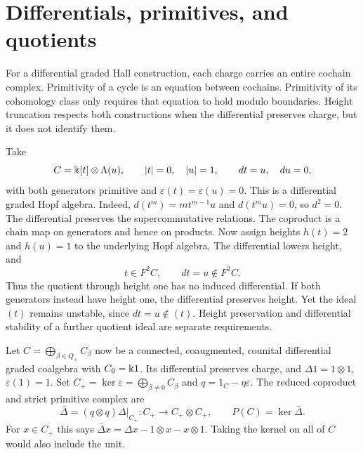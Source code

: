 \section{Differentials, primitives, and quotients}

For a differential graded Hall construction, each charge carries an
entire cochain complex.  Primitivity of a cycle is an equation between
cochains.  Primitivity of its cohomology class only requires that equation
to hold modulo boundaries.  Height truncation respects both constructions
when the differential preserves charge, but it does not identify them.

\begin{example}\label{differential-height}
Take
\[
 C=\Bbbk[t]\otimes\Lambda(u),\qquad |t|=0,\quad |u|=1,
 \qquad dt=u,\quad du=0,
\]
with both generators primitive and $\varepsilon(t)=\varepsilon(u)=0$.
This is a differential graded Hopf algebra.  Indeed,
$d(t^m)=mt^{m-1}u$ and $d(t^mu)=0$, so $d^2=0$.
The differential preserves the supercommutative relations.
The coproduct is a chain map on generators and hence on products.
Now assign heights $h(t)=2$ and $h(u)=1$ to the underlying Hopf algebra.
The differential lowers height, and
\[
 t\in F^2C,\qquad dt=u\notin F^2C.
\]
Thus the quotient through height one has no induced differential.
If both generators instead have height one, the differential preserves
height.  Yet the ideal $(t)$ remains unstable, since $dt=u\notin(t)$.
Height preservation and differential stability of a further quotient
ideal are separate requirements.
\end{example}

Let $C=\bigoplus_{\beta\in Q_+}C_\beta$ now be a connected,
coaugmented, counital differential graded coalgebra with
$C_0=\Bbbk1$.  Its differential preserves charge, and
$\Delta1=1\otimes1$, $\varepsilon(1)=1$.
Set $C_+=\ker\varepsilon=\bigoplus_{\beta\neq0}C_\beta$ and
$q=1_C-\eta\varepsilon$.
The reduced coproduct and strict primitive complex are
\begin{equation}
 \bar\Delta=(q\otimes q)\Delta|_{C_+}:C_+\to C_+\otimes C_+,
 \qquad P(C)=\ker\bar\Delta.\label{strict-primitives}
\end{equation}
For $x\in C_+$ this says
$\bar\Delta x=\Delta x-1\otimes x-x\otimes1$.
Taking the kernel on all of $C$ would also include the unit.

